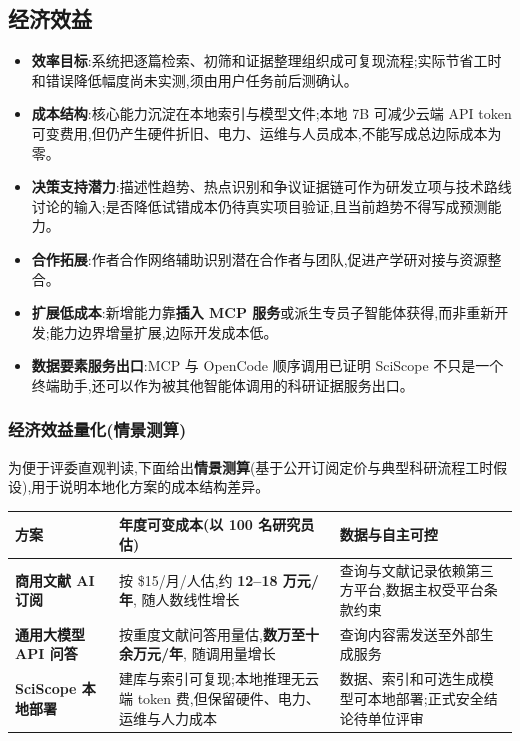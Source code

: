 \subsection{经济效益}
\begin{itemize}
\item \textbf{效率目标}:系统把逐篇检索、初筛和证据整理组织成可复现流程;实际节省工时和错误降低幅度尚未实测,须由用户任务前后测确认。
\item \textbf{成本结构}:核心能力沉淀在本地索引与模型文件;本地 7B 可减少云端 API token 可变费用,但仍产生硬件折旧、电力、运维与人员成本,不能写成总边际成本为零。
\item \textbf{决策支持潜力}:描述性趋势、热点识别和争议证据链可作为研发立项与技术路线讨论的输入;是否降低试错成本仍待真实项目验证,且当前趋势不得写成预测能力。
\item \textbf{合作拓展}:作者合作网络辅助识别潜在合作者与团队,促进产学研对接与资源整合。
\item \textbf{扩展低成本}:新增能力靠\textbf{插入 MCP 服务}或派生专员子智能体获得,而非重新开发;能力边界增量扩展,边际开发成本低。
\item \textbf{数据要素服务出口}:MCP 与 OpenCode 顺序调用已证明 SciScope 不只是一个终端助手,还可以作为被其他智能体调用的科研证据服务出口。
\end{itemize}

\subsubsection{经济效益量化(情景测算)}
为便于评委直观判读,下面给出\textbf{情景测算}(基于公开订阅定价与典型科研流程工时假设),用于说明本地化方案的成本结构差异。

\begin{tableblock}
\begin{tabularx}{0.96\textwidth}{>{\bfseries}p{30mm}X X}
\toprule
方案 & 年度可变成本(以 100 名研究员估) & 数据与自主可控 \\
\midrule
商用文献 AI 订阅 & 按 \$15/月/人估,约 \textbf{12--18 万元/年}, 随人数线性增长 & 查询与文献记录依赖第三方平台,数据主权受平台条款约束 \\
通用大模型 API 问答 & 按重度文献问答用量估,\textbf{数万至十余万元/年}, 随调用量增长 & 查询内容需发送至外部生成服务 \\
\rowcolor{SciPanel} SciScope 本地部署 & 建库与索引可复现;本地推理无云端 token 费,但保留硬件、电力、运维与人力成本 & 数据、索引和可选生成模型可本地部署;正式安全结论待单位评审 \\
\bottomrule
\end{tabularx}
\end{tableblock}

